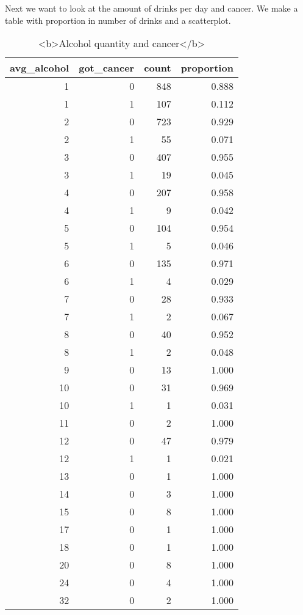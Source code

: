 \documentclass[
]{article}
\begin{document}
Next we want to look at the amount of drinks per day and cancer. We make
a table with proportion in number of drinks and a scatterplot.

\begin{table}

\caption{\label{tab:unnamed-chunk-107}<b>Alcohol quantity and cancer</b>}
\centering
\begin{tabular}[t]{r|r|r|r}
\hline
avg\_alcohol & got\_cancer & count & proportion\\
\hline
1 & 0 & 848 & 0.888\\
\hline
1 & 1 & 107 & 0.112\\
\hline
2 & 0 & 723 & 0.929\\
\hline
2 & 1 & 55 & 0.071\\
\hline
3 & 0 & 407 & 0.955\\
\hline
3 & 1 & 19 & 0.045\\
\hline
4 & 0 & 207 & 0.958\\
\hline
4 & 1 & 9 & 0.042\\
\hline
5 & 0 & 104 & 0.954\\
\hline
5 & 1 & 5 & 0.046\\
\hline
6 & 0 & 135 & 0.971\\
\hline
6 & 1 & 4 & 0.029\\
\hline
7 & 0 & 28 & 0.933\\
\hline
7 & 1 & 2 & 0.067\\
\hline
8 & 0 & 40 & 0.952\\
\hline
8 & 1 & 2 & 0.048\\
\hline
9 & 0 & 13 & 1.000\\
\hline
10 & 0 & 31 & 0.969\\
\hline
10 & 1 & 1 & 0.031\\
\hline
11 & 0 & 2 & 1.000\\
\hline
12 & 0 & 47 & 0.979\\
\hline
12 & 1 & 1 & 0.021\\
\hline
13 & 0 & 1 & 1.000\\
\hline
14 & 0 & 3 & 1.000\\
\hline
15 & 0 & 8 & 1.000\\
\hline
17 & 0 & 1 & 1.000\\
\hline
18 & 0 & 1 & 1.000\\
\hline
20 & 0 & 8 & 1.000\\
\hline
24 & 0 & 4 & 1.000\\
\hline
32 & 0 & 2 & 1.000\\
\hline
\end{tabular}
\end{table}
\end{document}
